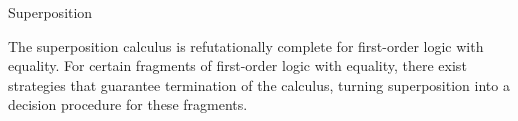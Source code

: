 \begin{entry}{Superposition}
\begin{technicalities}
The superposition calculus is refutationally complete for
first-order logic with equality.
For certain fragments of first-order logic with equality,
there exist strategies that guarantee termination of the calculus,
turning superposition into a decision procedure for these fragments.
\end{technicalities}



%
%
%
%
%
%
% 
%












\end{entry}
